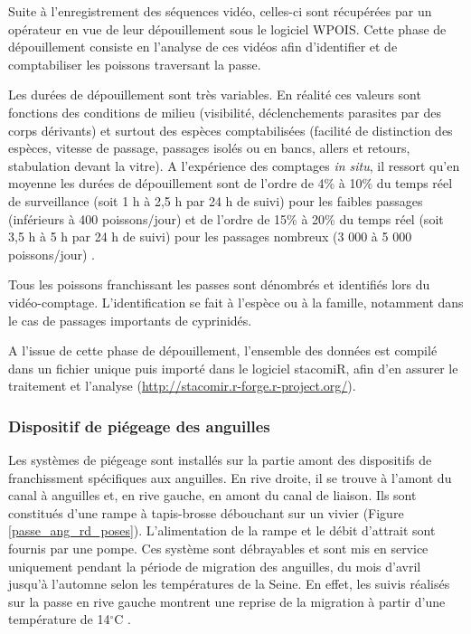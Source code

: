 \documentclass[11pt,titlepage,twoside]{article}\usepackage[]{graphicx}\usepackage[table]{xcolor}
\begin{document}
Suite à l'enregistrement des séquences vidéo, celles-ci sont récupérées par un opérateur en vue de leur dépouillement sous le logiciel WPOIS. Cette phase de dépouillement consiste en l'analyse de ces vidéos afin d'identifier et de comptabiliser les poissons traversant la passe.

Les durées de dépouillement sont très variables. En réalité ces valeurs sont fonctions des conditions de milieu (visibilité, déclenchements parasites par des corps dérivants) et surtout des espèces comptabilisées (facilité de distinction des espèces, vitesse de passage, passages isolés ou en bancs, allers et retours, stabulation devant la vitre). A l'expérience des comptages \textit{in situ}, il ressort qu'en moyenne les durées de dépouillement sont de l'ordre de 4\% à 10\% du temps réel de surveillance (soit 1 h à 2,5 h par 24 h de suivi) pour les faibles passages (inférieurs à 400 poissons/jour) et de l'ordre de 15\% à 20\% du temps réel (soit 3,5 h à 5 h par 24 h de suivi) pour les passages nombreux (3 000 à 5 000 poissons/jour) \citep{travade_les_1992}.

Tous les poissons franchissant les passes sont dénombrés et identifiés lors du vidéo-comptage. L'identification se fait à l'espèce ou à la famille, notamment dans le cas de passages importants de cyprinidés.

A l'issue de cette phase de dépouillement, l'ensemble des données est compilé dans un fichier unique puis importé dans le logiciel stacomiR, afin d'en assurer le traitement et l'analyse (\url{http://stacomir.r-forge.r-project.org/}).

\subsubsection{Dispositif de piégeage des anguilles}

Les systèmes de piégeage sont installés sur la partie amont des dispositifs de franchissment spécifiques aux anguilles. En rive droite, il se trouve à l'amont du canal à anguilles et, en rive gauche, en amont du canal de liaison. Ils sont constitués d'une rampe à \og tapis-brosse \fg{} débouchant sur un vivier (Figure \ref{passe_ang_rd_poses}). L'alimentation de la rampe et le débit d'attrait sont fournis par une pompe. Ces système sont débrayables et sont mis en service uniquement pendant la période de migration des anguilles, du mois d'avril jusqu'à l'automne selon les températures de la Seine. En effet, les suivis réalisés sur la passe en rive gauche montrent une reprise de la migration à partir d'une température de 14$^{\circ}$C \citep{mullet_suivi_2014,lenoir_suivi_2015,flesselle_suivi_2016,sanmartin_suivi_2018}.
\end{document}
